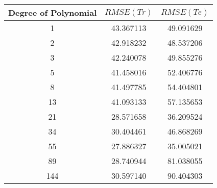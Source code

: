 \begin{tabular}{ccc}
\toprule
 Degree of Polynomial &  $RMSE(Tr)$ &  $RMSE(Te)$ \\
\midrule
                    1 &   43.367113 &   49.091629 \\
                    2 &   42.918232 &   48.537206 \\
                    3 &   42.240078 &   49.855276 \\
                    5 &   41.458016 &   52.406776 \\
                    8 &   41.497785 &   54.404801 \\
                   13 &   41.093133 &   57.135653 \\
                   21 &   28.571658 &   36.209524 \\
                   34 &   30.404461 &   46.868269 \\
                   55 &   27.886327 &   35.005021 \\
                   89 &   28.740944 &   81.038055 \\
                  144 &   30.597140 &   90.404303 \\
\bottomrule
\end{tabular}
